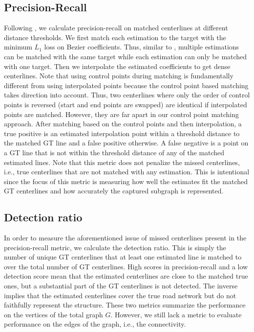 \documentclass[10pt,twocolumn,letterpaper]{article}
\begin{document}
\subsection{Precision-Recall}
Following \cite{DBLP:journals/corr/abs-2012-12160, DBLP:conf/cvpr/HomayounfarMLU18}, we calculate precision-recall on matched centerlines at different distance thresholds. We first match each estimation to the target with the minimum $L_1$ loss on Bezier coefficients. Thus, similar to \cite{DBLP:journals/corr/abs-2012-12160}, multiple estimations can be matched with the same target while each estimation can only be matched with one target. Then we interpolate the estimated coefficients to get dense centerlines. Note that using control points during matching is fundamentally different from using interpolated points because the control point based matching takes direction into account. Thus, two centerlines where only the order of control points is reversed (start and end points are swapped) are identical if interpolated points are matched. However, they are far apart in our control point matching approach. After matching based on the control points and then interpolation, a true positive is an estimated interpolation point within a threshold distance to the matched GT line and a false positive otherwise. A false negative is a point on a GT line that is not within the threshold distance of any of the matched estimated lines. Note that this metric does not penalize the missed centerlines, i.e., true centerlines that are not matched with any estimation. This is intentional since the focus of this metric is measuring how well the estimates fit the matched GT centerlines and how accurately the captured subgraph is represented.   

\subsection{Detection ratio}

In order to measure the aforementioned issue of missed centerlines present in the precision-recall metric, we calculate the detection ratio. This is simply the number of unique GT centerlines that at least one estimated line is matched to over the total number of GT centerlines. High scores in precision-recall and a low detection score mean that the estimated centerlines are close to the matched true ones, but a substantial part of the GT centerlines is not detected. The inverse implies that the estimated centerlines cover the true road network but do not faithfully represent the structure. These two metrics summarize the performance on the vertices of the total graph $G$. However, we still lack a metric to evaluate performance on the edges of the graph, i.e., the connectivity.
\end{document}
